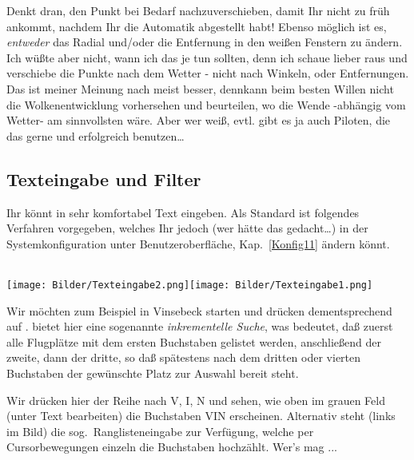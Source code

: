 Denkt dran, den Punkt bei Bedarf nachzuverschieben, damit Ihr nicht zu früh ankommt, nachdem Ihr die Automatik abgestellt habt! Ebenso möglich ist es, \textsl{entweder} das Radial und/oder die Entfernung in den weißen Fenstern zu ändern. Ich wüßte aber nicht, wann ich das je tun sollten, denn ich schaue lieber raus und verschiebe die Punkte nach dem Wetter - nicht nach Winkeln, oder Entfernungen.
Das ist meiner Meinung nach meist besser, denn\xc kann beim besten Willen nicht die Wolkenentwicklung vorhersehen und beurteilen, wo die Wende -abhängig vom Wetter- am sinnvollsten wäre. Aber wer weiß, evtl. gibt es ja auch Piloten, die das gerne und erfolgreich benutzen\dots
%
\subsection{Texteingabe und Filter}\label{Texteingabe}\label{Filter}
Ihr könnt in \xc sehr komfortabel Text eingeben.  Als Standard ist folgendes Verfahren vorgegeben, welches Ihr jedoch (wer hätte das gedacht\dots) in der Systemkonfiguration unter Benutzeroberfläche, Kap.\  \ref{Konfig11} ändern könnt.

\begin{center}
\blink~\blink~\blink~\blink~\\

 \texttt{[image: Bilder/Texteingabe2.png]}\qquad \texttt{[image: Bilder/Texteingabe1.png]}
\end{center}

Wir möchten zum Beispiel in \textsf{Vinsebeck} starten und drücken dementsprechend auf .
\xc bietet hier eine sogenannte\textsl{ inkrementelle Suche}, was bedeutet, daß zuerst alle Flugplätze mit
dem ersten Buchstaben gelistet werden, anschließend der zweite, dann der dritte, so daß spätestens nach
dem dritten oder vierten Buchstaben der gewünschte Platz zur Auswahl bereit steht.

Wir drücken hier der Reihe nach \textsf{V, I, N} und sehen, wie oben im grauen Feld  (unter \textsf{Text bearbeiten})
die Buchstaben \textsf{VIN} erscheinen.  Alternativ steht (links im Bild) die
sog.\ Ranglisteneingabe zur Verfügung, welche per Cursorbewegungen einzeln die Buchstaben hochzählt. Wer's mag ...

